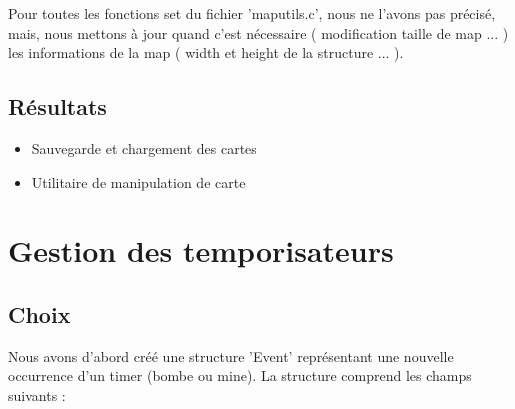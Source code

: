 \documentclass[a4paper]{article}
\newcommand{\cmark}{\ding{51}}%
\newcommand{\xmark}{\ding{55}}%
\newcommand{\done}{\rlap{$\square$}{\raisebox{2pt}{\large\hspace{1pt}\cmark}}%
\hspace{-2.5pt}}
\newcommand{\wontfix}{\rlap{$\square$}{\large\hspace{1pt}\xmark}}
\begin{document}
Pour toutes les fonctions set du fichier 'maputils.c', nous ne l'avons pas précisé, mais, nous mettons à jour quand c'est nécessaire ( modification taille de map ... ) les informations de la map ( width et height de la structure ... ).


\subsection{Résultats}
\begin{itemize}
  \item Sauvegarde et chargement des cartes
  
  \item Utilitaire de manipulation de carte
\end{itemize}
\section{Gestion des temporisateurs}
\subsection{Choix}
Nous avons d'abord créé une structure 'Event' représentant une nouvelle occurrence d'un timer (bombe ou mine). La structure comprend les champs suivants :
\end{document}
